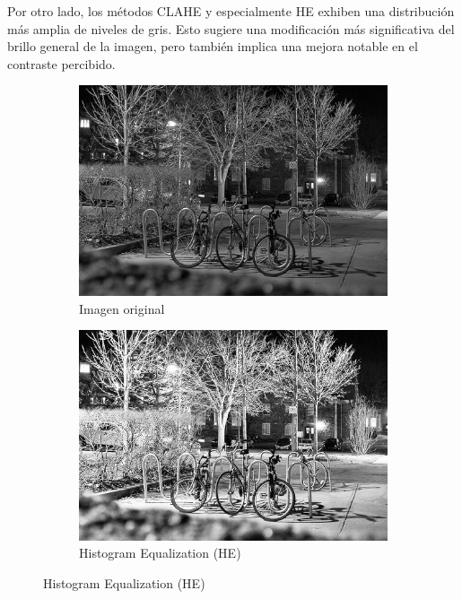 \documentclass[sigchi]{acmart}
\begin{document}
Por otro lado, los métodos CLAHE y especialmente HE exhiben una distribución más amplia de
niveles de gris. Esto sugiere una modificación más significativa del brillo general de la
imagen, pero también implica una mejora notable en el contraste percibido.

\begin{figure}[htbp]
	\centering

	\begin{subfigure}[b]{0.32\textwidth}
		\centering
		\includegraphics[width=\linewidth]{./procesadas/2015_00002/2015_00002_original.png}
		\caption{Imagen original}
	\end{subfigure}
	\hfill
	\begin{subfigure}[b]{0.32\textwidth}
		\centering
		\includegraphics[width=\linewidth]{./procesadas/2015_00002/2015_00002_he.png}
		\caption{Histogram Equalization (HE)}
	\end{subfigure}


\end{figure}
\end{document}
